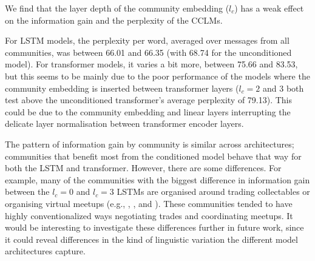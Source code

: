 \documentclass[11pt]{article}
\begin{document}
We find that the layer depth of the community embedding 
($l_c$) has a weak effect on the information gain and the
perplexity of the CCLMs.

For LSTM models, the perplexity per word, averaged over
messages from all communities, was between \num{66.01} and \num{66.35}
(with \num{68.74} for the unconditioned model).
For transformer models, it varies a bit more, between \num{75.66} and \num{83.53},
but this seems to be mainly due to the poor performance of the models where
the community embedding is inserted between transformer layers
($l_c=2$ and $3$ both test above the unconditioned transformer's 
average perplexity of \num{79.13}).
This could be due to the community embedding and linear layers
interrupting the delicate layer normalisation between transformer encoder layers.

The pattern of information gain by community is similar across
architectures;  communities that benefit most from the conditioned
model behave that way for both the LSTM and transformer.  However,
there are some differences.  For example, many of the communities with the biggest 
difference in information gain between the $l_c=0$ and $l_c=3$ LSTMs 
are organised around trading collectables or organising virtual meetups
(e.g.,
,
, and
).  
These communities tended to have highly conventionalized ways negotiating trades
and coordinating meetups.
It would be interesting to investigate these differences further in future work, since it
could reveal differences in the kind of linguistic variation the
different model architectures capture.



\end{document}
